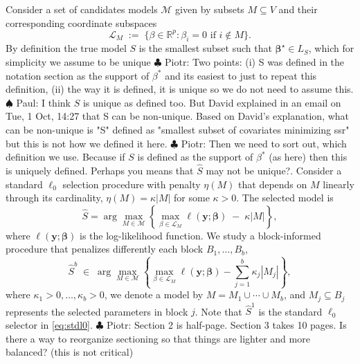 \documentclass[aos]{imsart}
\theoremstyle{plain}
\newcommand{\piotr}[1]{{\small{\color{red} \sf $\clubsuit$ Piotr: #1}}}
\newcommand{\paul}[1]{{\small{\color{green} \sf $\spadesuit$ Paul: #1}}}
\newcommand{\R}{\mathbb{R}}
\newcommand{\M}{\mathcal{M}}
\newcommand{\bs}{\boldsymbol}
\begin{document}
Consider a set of candidates models $\M$ given by subsets $M\subseteq V$ and their corresponding coordinate subspaces
$$
\mathcal{L}_M\;:=\;\{\beta\in \R^p: \beta_i=0\mbox{ if }i\notin M\}.
$$
By definition the true model $S$ is the smallest subset such that $\bs\beta^\star\in L_S$, which for simplicity we assume to be unique \piotr{Two points: (i) S was defined in the notation section as the support of $\beta^*$ and its easiest to just to repeat this definition, (ii) the way it is defined, it is unique so we do not need to assume this.} \paul{I think $S$ is unique as defined too. But David explained in an email on Tue, 1 Oct, 14:27 that S can be non-unique. Based on David's explanation, what can be non-unique is "S" defined as "smallest subset of covariates minimizing ssr" but this is not how we defined it here.}\piotr{Then we need to sort out, which definition we use. Because if $S$ is defined as the support of $\beta^*$ (as here) then this is uniquely defined. Perhaps you means that $\widehat S$ may not be unique?}.
Consider a standard $\ell_0$ selection procedure with penalty $\eta(M)$ that depends on $M$ linearly 
through its cardinality, $\eta(M)=\kappa |M|$ for some $\kappa>0$. The selected model is
\begin{equation}\label{eq:stdl0}
\hat{S}= \arg\max_{M\in \M} \left\{\max_{\beta\in \mathcal{L}_M}\ell(\bs y; \bs \beta)\;-\;\kappa |M|\right\},
\end{equation}
where $\ell(\bs y; \bs \beta)$ is the log-likelihood function. 
We study a block-informed procedure that penalizes differently each block $B_1,\ldots,B_b$,
\begin{equation}\label{eq:Mhat}
  \hat S^b\;\in\;\arg\max_{M\in \M} \left\{\max_{\beta\in \mathcal{L}_M}\ell(\bs y; \bs \beta)-\sum_{j=1}^b\kappa_j |M_j| \right\},
\end{equation}
where $\kappa_1>0,\ldots,\kappa_b>0$, we denote a model by $M=M_1\cup\cdots\cup M_b$, and $M_j\subseteq B_j$ represents the  selected parameters in block $j$.
Note that $\hat{S}^1$ is the standard $\ell_0$ selector in \eqref{eq:stdl0}.
\piotr{Section 2 is half-page. Section 3 takes 10 pages. Is there a way to reorganize sectioning so that things are lighter and more balanced? (this is not critical)}
\end{document}
